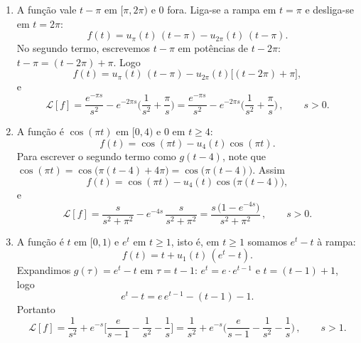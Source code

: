 \begin{enumerate}[label=(\alph*)]
\item A função vale $t-\pi$ em $[\pi,2\pi)$ e $0$ fora. Liga-se a rampa em $t=\pi$ e desliga-se em $t=2\pi$:
\[
f(t)=u_\pi(t)\,(t-\pi)-u_{2\pi}(t)\,(t-\pi).
\]
No segundo termo, escrevemos $t-\pi$ em potências de $t-2\pi$: $t-\pi=(t-2\pi)+\pi$. Logo
\[
f(t)=u_\pi(t)\,(t-\pi)-u_{2\pi}(t)\big[(t-2\pi)+\pi\big],
\]
e
\[
\mathcal{L}[f]=\frac{e^{-\pi s}}{s^2}-e^{-2\pi s}\Big(\frac1{s^2}+\frac{\pi}{s}\Big)
=\boxed{\dfrac{e^{-\pi s}}{s^2}-e^{-2\pi s}\Big(\dfrac{1}{s^2}+\dfrac{\pi}{s}\Big)}\,,\qquad s>0.
\]

\item A função é $\cos(\pi t)$ em $[0,4)$ e $0$ em $t\ge 4$:
\[
f(t)=\cos(\pi t)-u_4(t)\cos(\pi t).
\]
Para escrever o segundo termo como $g(t-4)$, note que $\cos(\pi t)=\cos\big(\pi(t-4)+4\pi\big)=\cos\big(\pi(t-4)\big)$. Assim
\[
f(t)=\cos(\pi t)-u_4(t)\cos\big(\pi(t-4)\big),
\]
e
\[
\mathcal{L}[f]=\frac{s}{s^2+\pi^2}-e^{-4s}\,\frac{s}{s^2+\pi^2}
=\boxed{\dfrac{s\,\big(1-e^{-4s}\big)}{s^2+\pi^2}}\,,\qquad s>0.
\]

\item A função é $t$ em $[0,1)$ e $e^t$ em $t\ge 1$, isto é, em $t\ge 1$ somamos $e^t-t$ à rampa:
\[
f(t)=t+u_1(t)\,(e^t-t).
\]
Expandimos $g(\tau)=e^t-t$ em $\tau=t-1$: $e^t=e\cdot e^{t-1}$ e $t=(t-1)+1$, logo
\[
e^t-t=e\,e^{t-1}-(t-1)-1.
\]
Portanto
\[
\mathcal{L}[f]=\frac1{s^2}+e^{-s}\Big[\frac{e}{s-1}-\frac1{s^2}-\frac1s\Big]
=\boxed{\dfrac{1}{s^2}+e^{-s}\Big(\dfrac{e}{s-1}-\dfrac{1}{s^2}-\dfrac{1}{s}\Big)}\,,\qquad s>1.
\]

\end{enumerate}

